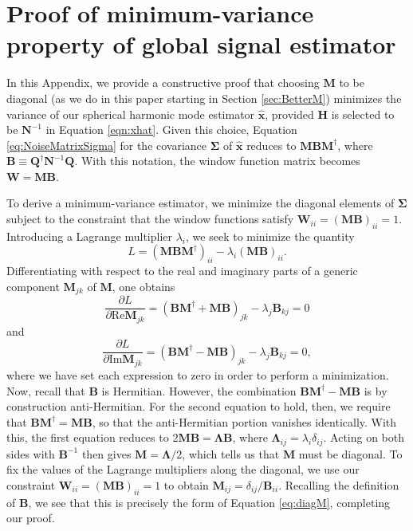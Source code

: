 \documentclass[twocolumn,apj,numberedappendix]{emulateapj}
\newcommand{\xhat}{\hat{\mathbf{x}}}
\newcommand{\N}{\mathbf{N}}
\newcommand{\Hmat}{\mathbf{H}}
\newcommand{\Q}{\mathbf{Q}}
\newcommand{\M}{\mathbf{M}}
\newcommand{\W}{\mathbf{W}}
\begin{document}
\pagebreak
\appendix
\section{Proof of minimum-variance property of global signal estimator}
\label{minVarProof}

In this Appendix, we provide a constructive proof that choosing $\M$ to be diagonal (as we do in this paper starting in Section \ref{sec:BetterM}) minimizes the variance of our spherical harmonic mode estimator $\xhat$, provided $\Hmat$ is selected to be $\mathbf{N}^{-1}$ in Equation \eqref{eqn:xhat}. Given this choice, Equation \eqref{eq:NoiseMatrixSigma} for the covariance $\boldsymbol \Sigma$ of $\xhat$ reduces to  $\M \mathbf{B} \M^\dagger$, where $\mathbf{B} \equiv \Q^\dagger \N^{-1} \Q$. With this notation, the window function matrix becomes $\W = \M \mathbf{B}$.

To derive a minimum-variance estimator, we minimize the diagonal elements of $\boldsymbol \Sigma$ subject to the constraint that the window functions satisfy $\W_{ii} = (\M \mathbf{B})_{ii} =1$. Introducing a Lagrange multiplier $\lambda_i$, we seek to minimize the quantity
\begin{equation}
L = (\M \mathbf{B} \M^\dagger)_{ii} - \lambda_i  (\M \mathbf{B})_{ii}.
\end{equation}
Differentiating with respect to the real and imaginary parts of a generic component $\M_{jk}$ of $\M$, one obtains
\begin{equation}
\frac{\partial L}{\partial \textrm{Re} \M_{jk}} = (\mathbf{B} \M^\dagger + \M \mathbf{B})_{jk} - \lambda_j \mathbf{B}_{kj} =0
\end{equation}
and
\begin{equation}
\frac{\partial L}{\partial \textrm{Im} \M_{jk}} = (\mathbf{B} \M^\dagger - \M \mathbf{B})_{jk} - \lambda_j \mathbf{B}_{kj} =0,
\end{equation}
where we have set each expression to zero in order to perform a minimization. Now, recall that $\mathbf{B}$ is Hermitian. However, the combination $\mathbf{B} \M^\dagger - \M \mathbf{B}$ is by construction anti-Hermitian. For the second equation to hold, then, we require that $\mathbf{B} \M^\dagger = \M \mathbf{B}$, so that the anti-Hermitian portion vanishes identically. With this, the first equation reduces to $2 \M \mathbf{B} = \boldsymbol \Lambda \mathbf{B}$, where $\boldsymbol \Lambda_{ij} = \lambda_i \delta_{ij}$. Acting on both sides with $\mathbf{B}^{-1}$ then gives $\M = \boldsymbol \Lambda / 2$, which tells us that $\M$ must be diagonal. To fix the values of the Lagrange multipliers along the diagonal, we use our constraint $\W_{ii} = (\M \mathbf{B})_{ii} =1$ to obtain $\M_{ij} = \delta_{ij} / \mathbf{B}_{ii}$. Recalling the definition of $\mathbf{B}$, we see that this is precisely the form of Equation \eqref{eq:diagM}, completing our proof.
\end{document}
